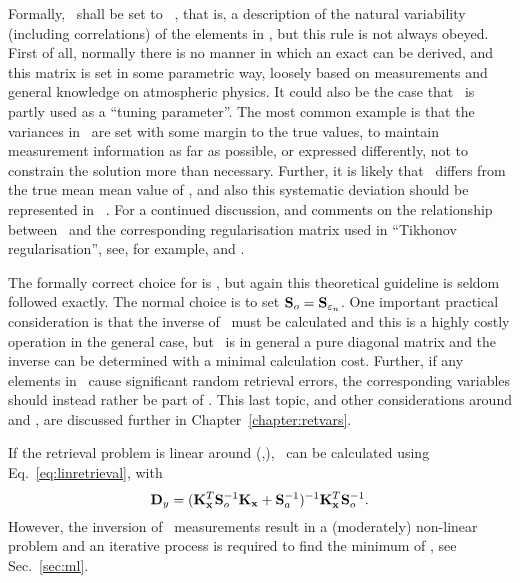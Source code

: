 Formally, \ shall be set to \aCvrMtr{\SttVct}\ \citep{rodgers:00},
that is, a description of the natural variability (including correlations) of
the elements in \SttVct, but this rule is not always obeyed. First of all,
normally there is no manner in which an exact \aCvrMtr{\SttVct} can be derived,
and this matrix is set in some parametric way, loosely based on measurements
and general knowledge on atmospheric physics. It could also be the case that
\ is partly used as a ``tuning parameter''. The most common example
is that the variances in \ are set with some margin to the true
values, to maintain measurement information as far as possible, or expressed
differently, not to constrain the solution more than necessary. Further, it is
likely that \ differs from the true mean mean value of \SttVct, and
also this systematic deviation should be represented in \
\citep{eriksson:analy:00}. For a continued discussion, and comments on the
relationship between \aCvrMtr{a}\ and the corresponding regularisation matrix
used in ``Tikhonov regularisation'', see, for example,
\citet{eriksson:analy:00} and \citet{ungermann2011tomographic}.

The formally correct choice for  is 
\citep{eriksson:analy:00,rodgers:00}, but again this theoretical guideline is
seldom followed exactly. The normal choice is to set
$\mathbf{S}_{o}=\mathbf{S}_{\varepsilon_n}$. One important practical consideration is
that the inverse of \aCvrMtr{\MsrErrVct_o}\ must be calculated and this is a
highly costly operation in the general case, but \aCvrMtr{\MsrErrVct_n}\ is in
general a pure diagonal matrix and the inverse can be determined with a minimal
calculation cost. Further, if any elements in \FrwMdlVct\ cause significant
random retrieval errors, the corresponding variables should instead rather be
part of \SttVct. This last topic, and other considerations around \aCvrMtr{o}
and \aCvrMtr{a}, are discussed further in Chapter~\ref{chapter:retvars}.

If the retrieval problem is linear around (,\FrwMdlVctHat), \RtrVct\
can be calculated using Eq.~\ref{eq:linretrieval}, with
\citep[][Eq.~4.5]{rodgers:00}
\begin{equation}
  \label{eq:lindy}
  \mathbf{D}_{y} = (\mathbf{K}_{\mathbf{x}}^T\mathbf{S}_{o}^{-1}\mathbf{K}_{\mathbf{x}}
  +\mathbf{S}_{a}^{-1})^{-1}\mathbf{K}_{\mathbf{x}}^T\mathbf{S}_{o}^{-1}.
\end{equation}
However, the inversion of \smr\ measurements result in a (moderately)
non-linear problem and an iterative process is required to find the minimum of
\CstFnc, see Sec.~\ref{sec:ml}.


